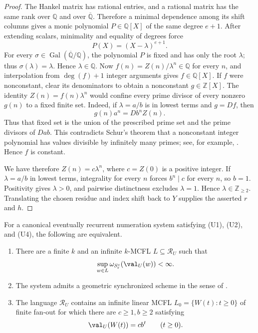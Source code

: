 \begin{proof}
  The Hankel matrix has rational entries, and a rational matrix has the
  same rank over \(\mathbb Q\) and over \(\overline{\mathbb Q}\).
  Therefore a minimal dependence among its shift columns gives a monic
  polynomial \(P\in\mathbb Q[X]\) of the same degree \(e+1\). After
  extending scalars, minimality and equality of degrees force
  \[
    P(X)=(X-\lambda)^{e+1}.
  \]
  For every
  \(\sigma\in\operatorname{Gal}(\overline{\mathbb Q}/\mathbb Q)\), the
  polynomial \(P\) is fixed and has only the root \(\lambda\); thus
  \(\sigma(\lambda)=\lambda\). Hence \(\lambda\in\mathbb Q\). Now
  \(f(n)=Z(n)/\lambda^n\in\mathbb Q\)
  for every \(n\), and interpolation from \(\deg(f)+1\) integer
  arguments gives \(f\in\mathbb Q[X]\). If \(f\) were nonconstant, clear its
  denominators to obtain a nonconstant \(g\in\mathbb Z[X]\). The
  identity \(Z(n)=f(n)\lambda^n\) would confine every prime divisor of
  every nonzero \(g(n)\) to a fixed finite set. Indeed, if
  \(\lambda=a/b\) is in lowest terms and \(g=Df\), then
  \[
    g(n)a^n=Db^nZ(n).
  \]
  Thus that fixed set is the union of the prescribed prime set and the
  prime divisors of \(Dab\). This contradicts Schur's theorem that a
  nonconstant integer polynomial has values divisible by infinitely
  many primes; see, for example, \cite{HardyWright2008}. Hence \(f\) is
  constant.

  We have therefore \(Z(n)=c\lambda^n\), where
  \(c=Z(0)\) is a positive integer. If \(\lambda=a/b\) in lowest terms,
  integrality for every \(n\) forces \(b^n\mid c\) for every \(n\), so
  \(b=1\). Positivity gives \(\lambda>0\), and pairwise distinctness
  excludes \(\lambda=1\). Hence \(\lambda\in\mathbb Z_{\ge2}\).
  Translating the chosen residue and
  index shift back to \(Y\) supplies the asserted \(r\) and \(h\).
\end{proof}

\begin{theorem}
  \label{thm:bounded-outside-support-geometric-ray}
  For a canonical eventually recurrent numeration system satisfying
  \textup{(U1)}, \textup{(U2)}, and \textup{(U4)}, the following are
  equivalent.
  \begin{enumerate}[label=\textup{(\roman*)}]
    \item There are a finite \(k\) and an infinite \(k\)-MCFL
    \(L\subseteq\mathcal R_U\) such that
    \[
      \sup_{w\in L}\omega_{S_{\mathrm r}^c}(\val_U(w))<\infty.
    \]
    \item The system admits a geometric synchronized scheme in the
    sense of .
    \item The language \(\mathcal R_U\) contains an infinite linear MCFL
    \(L_0=\{W(t):t\ge0\}\) of finite fan-out for which there are
    \(c\ge1,b\ge2\) satisfying
    \[
      \val_U(W(t))=cb^t\qquad(t\ge0).
    \]
  \end{enumerate}
\end{theorem}


